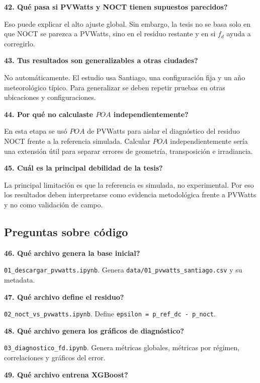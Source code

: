 \documentclass[11pt, letterpaper]{article}
\newcommand{\fd}{f_d}
\begin{document}
\textbf{42. \textquestiondown Qu\'e pasa si PVWatts y NOCT tienen supuestos parecidos?}

Eso puede explicar el alto ajuste global. Sin embargo, la tesis no se basa solo en que NOCT se parezca a PVWatts, sino en el residuo restante y en si \(\fd\) ayuda a corregirlo.

\textbf{43. \textquestiondown Tus resultados son generalizables a otras ciudades?}

No autom\'aticamente. El estudio usa Santiago, una configuraci\'on fija y un a\~no meteorol\'ogico t\'ipico. Para generalizar se deben repetir pruebas en otras ubicaciones y configuraciones.

\textbf{44. \textquestiondown Por qu\'e no calculaste \(POA\) independientemente?}

En esta etapa se us\'o \(POA\) de PVWatts para aislar el diagn\'ostico del residuo NOCT frente a la referencia simulada. Calcular \(POA\) independientemente ser\'ia una extensi\'on \'util para separar errores de geometr\'ia, transposici\'on e irradiancia.

\textbf{45. \textquestiondown Cu\'al es la principal debilidad de la tesis?}

La principal limitaci\'on es que la referencia es simulada, no experimental. Por eso los resultados deben interpretarse como evidencia metodol\'ogica frente a PVWatts y no como validaci\'on de campo.

\subsection{Preguntas sobre c\'odigo}

\textbf{46. \textquestiondown Qu\'e archivo genera la base inicial?}

\texttt{01\_descargar\_pvwatts.ipynb}. Genera \texttt{data/01\_pvwatts\_santiago.csv} y su metadata.

\textbf{47. \textquestiondown Qu\'e archivo define el residuo?}

\texttt{02\_noct\_vs\_pvwatts.ipynb}. Define \texttt{epsilon = p\_ref\_dc - p\_noct}.

\textbf{48. \textquestiondown Qu\'e archivo genera los gr\'aficos de diagn\'ostico?}

\texttt{03\_diagnostico\_fd.ipynb}. Genera m\'etricas globales, m\'etricas por r\'egimen, correlaciones y gr\'aficos del error.

\textbf{49. \textquestiondown Qu\'e archivo entrena XGBoost?}
\end{document}
